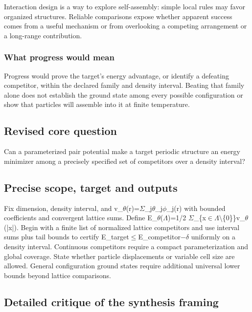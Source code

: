 \documentclass[
  11pt,
]{article}
\begin{document}
Interaction design is a way to explore self-assembly: simple local rules
may favor organized structures. Reliable comparisons expose whether
apparent success comes from a useful mechanism or from overlooking a
competing arrangement or a long-range contribution.

\subsubsection{What progress would mean}

Progress would prove the target's energy advantage, or identify a
defeating competitor, within the declared family and density interval.
Beating that family alone does not establish the ground state among
every possible configuration or show that particles will assemble into
it at finite temperature.

\subsection{Revised core question}

Can a parameterized pair potential make a target periodic structure an
energy minimizer among a precisely specified set of competitors over a
density interval?

\subsection{Precise scope, target and outputs}

Fix dimension, density interval, and
v\_\ensuremath{\theta}(r)=\ensuremath{\Sigma}\_j\ensuremath{\theta}\_j\ensuremath{\phi}\_j(r)
with bounded coefficients and convergent lattice sums. Define
E\_\ensuremath{\theta}(\ensuremath{\Lambda})=1/2
\ensuremath{\Sigma}\_\{x\ensuremath{\in}\ensuremath{\Lambda}\ensuremath{\setminus}\{0\}\}v\_\ensuremath{\theta}(|x|).
Begin with a finite list of normalized lattice competitors and use
interval sums plus tail bounds to certify
E\_target\ensuremath{\le}E\_competitor\ensuremath{-}\ensuremath{\delta}
uniformly on a density interval. Continuous competitors require a
compact parameterization and global coverage. State whether particle
displacements or variable cell size are allowed. General configuration
ground states require additional universal lower bounds beyond lattice
comparisons.

\subsection{Detailed critique of the synthesis framing}
\end{document}
